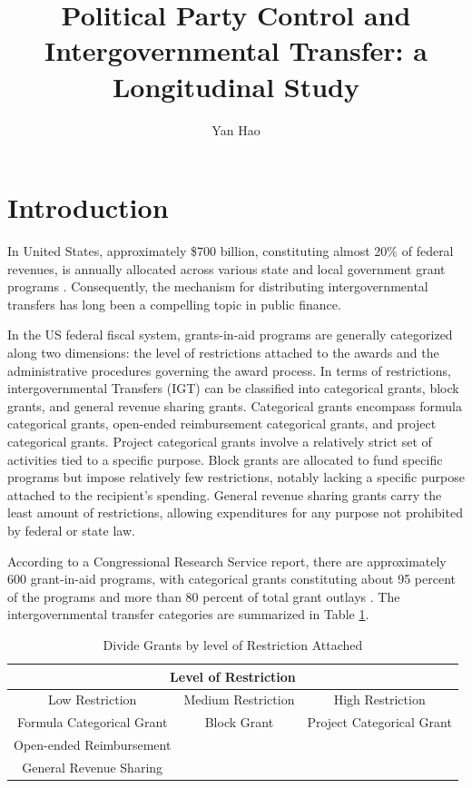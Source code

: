 \documentclass[man]{apa7}
\title{Political Party Control and Intergovernmental Transfer: a Longitudinal Study}
\author{Yan Hao}
\affiliation{Pennsylvania State University\\School of Public Affairs}
\begin{document}
\maketitle

\section{Introduction}


In United States, approximately \$700 billion, constituting almost 20\% of federal revenues, is annually allocated across various state and local government grant programs \parencite{rosenstiel2021congressional}. Consequently, the mechanism for distributing intergovernmental transfers has long been a compelling topic in public finance.

In the US federal fiscal system, grants-in-aid programs are generally categorized along two dimensions: the level of restrictions attached to the awards and the administrative procedures governing the award process. In terms of restrictions, intergovernmental Transfers (IGT) can be classified into categorical grants, block grants, and general revenue sharing grants. Categorical grants encompass formula categorical grants, open-ended reimbursement categorical grants, and project categorical grants. Project categorical grants involve a relatively strict set of activities tied to a specific purpose. Block grants are allocated to fund specific programs but impose relatively few restrictions, notably lacking a specific purpose attached to the recipient's spending. General revenue sharing grants carry the least amount of restrictions, allowing expenditures for any purpose not prohibited by federal or state law.

According to a Congressional Research Service report, there are approximately 600 grant-in-aid programs, with categorical grants constituting about 95 percent of the programs and more than 80 percent of total grant outlays \parencite{dilger2015federal}. The intergovernmental transfer categories are summarized in Table \ref{igtkinds}.%

\begin{table}[H]
  \centering
  \caption{Divide Grants by level of Restriction Attached}
  \begin{tabular}{ccc}
    \toprule
    \multicolumn{3}{c}{Level of Restriction}                                   \\
    \midrule
    Low Restriction           & Medium Restriction & High Restriction          \\
    \midrule
    Formula Categorical Grant & Block Grant        & Project Categorical Grant \\
    Open-ended Reimbursement  &                    &                           \\
    General Revenue Sharing   &                    &                           \\
    \bottomrule
  \end{tabular}%
  \label{igtkinds}%
\end{table}%
\end{document}
